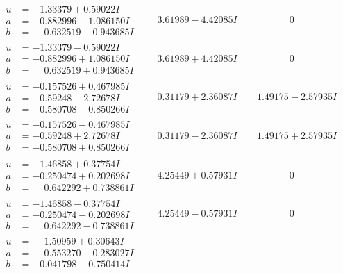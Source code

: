 \documentclass[1p]{elsarticle_modified}
\theoremstyle{definition}
\begin{document}
$$\begin{array}{c|c|c}
\begin{aligned}
u &= -1.33379 + 0.59022 I \\
a &= -0.882996 - 1.086150 I \\
b &= \phantom{-}0.632519 - 0.943685 I\end{aligned}
 & \phantom{-}3.61989 - 4.42085 I & \phantom{-0.000000 } 0 \\ \hline\begin{aligned}
u &= -1.33379 - 0.59022 I \\
a &= -0.882996 + 1.086150 I \\
b &= \phantom{-}0.632519 + 0.943685 I\end{aligned}
 & \phantom{-}3.61989 + 4.42085 I & \phantom{-0.000000 } 0 \\ \hline\begin{aligned}
u &= -0.157526 + 0.467985 I \\
a &= -0.59248 - 2.72678 I \\
b &= -0.580708 - 0.850266 I\end{aligned}
 & \phantom{-}0.31179 + 2.36087 I & \phantom{-}1.49175 - 2.57935 I \\ \hline\begin{aligned}
u &= -0.157526 - 0.467985 I \\
a &= -0.59248 + 2.72678 I \\
b &= -0.580708 + 0.850266 I\end{aligned}
 & \phantom{-}0.31179 - 2.36087 I & \phantom{-}1.49175 + 2.57935 I \\ \hline\begin{aligned}
u &= -1.46858 + 0.37754 I \\
a &= -0.250474 + 0.202698 I \\
b &= \phantom{-}0.642292 + 0.738861 I\end{aligned}
 & \phantom{-}4.25449 + 0.57931 I & \phantom{-0.000000 } 0 \\ \hline\begin{aligned}
u &= -1.46858 - 0.37754 I \\
a &= -0.250474 - 0.202698 I \\
b &= \phantom{-}0.642292 - 0.738861 I\end{aligned}
 & \phantom{-}4.25449 - 0.57931 I & \phantom{-0.000000 } 0 \\ \hline\begin{aligned}
u &= \phantom{-}1.50959 + 0.30643 I \\
a &= \phantom{-}0.553270 - 0.283027 I \\
b &= -0.041798 - 0.750414 I\end{aligned}

\end{array}$$
\end{document}
